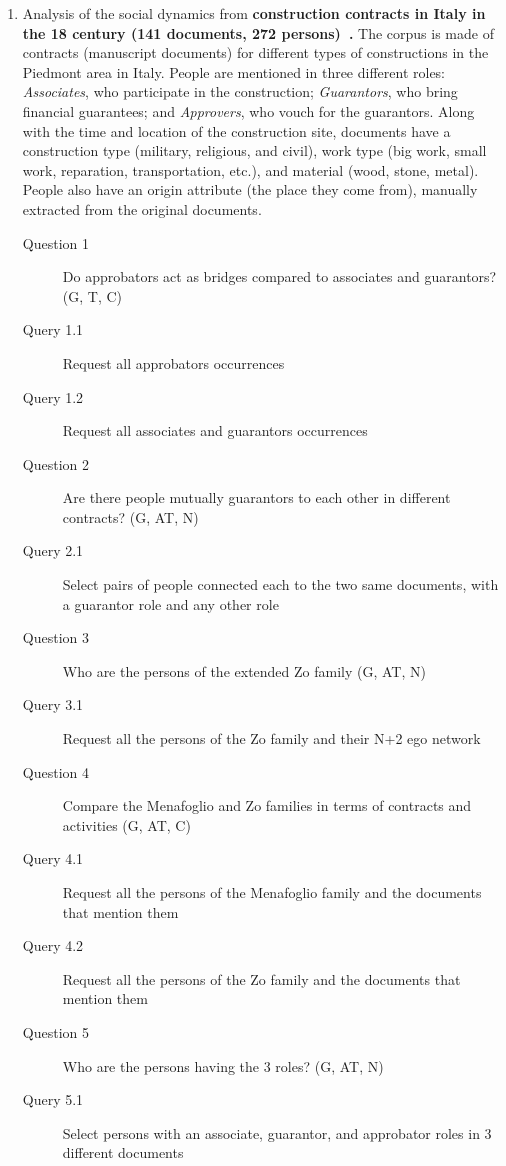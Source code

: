 \begin{enumerate}
    \item Analysis of the social dynamics from \textbf{construction contracts in Italy in the 18 century (141 documents, 272 persons)~\cite{Cristofoli2018}.}
    The corpus is made of contracts (manuscript documents) for different types of constructions in the Piedmont area in Italy. People are mentioned in three different roles: \textit{Associates}, who participate in the construction; \textit{Guarantors}, who bring financial guarantees; and \textit{Approvers}, who vouch for the guarantors. Along with the time and location of the construction site, documents have a construction type (military, religious, and civil), work type (big work, small work, reparation, transportation, etc.), and material (wood, stone, metal). People also have an origin attribute (the place they come from), manually extracted from the original documents.
    \begin{footnotesize}
    \begin{description}
    \item[Question 1] Do approbators act as bridges compared to associates and guarantors? (G, T, C)
    \item[\myindent Query 1.1] Request all approbators occurrences
    \item[\myindent Query 1.2 ] Request all associates and guarantors occurrences
    \item[Question 2] Are there people mutually guarantors to each other in different contracts? (G, AT, N)
    \item[\myindent Query 2.1] Select pairs of people connected each to the two same documents, with a guarantor role and any other role
    \item[Question 3] Who are the persons of the extended Zo family (G, AT, N)
    \item[\myindent Query 3.1] Request all the persons of the Zo family and their N+2 ego network
    \item[Question 4] Compare the Menafoglio and Zo families in terms of contracts and activities (G, AT, C)
    \item[\myindent Query 4.1] Request all the persons of the Menafoglio family and the documents that mention them
    \item[\myindent Query 4.2] Request all the persons of the Zo family and  the documents that mention them
    \item[Question 5] Who are the persons having the 3 roles? (G, AT, N)
    \item[\myindent Query 5.1] Select persons with an associate, guarantor, and approbator roles in 3 different documents

\end{description}
\end{footnotesize}
\end{enumerate}
